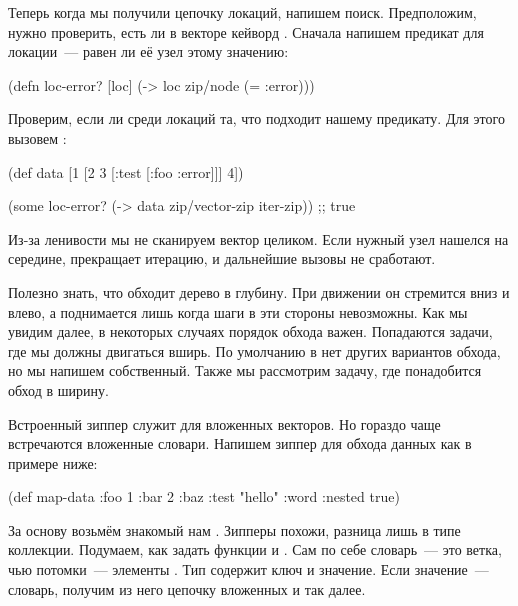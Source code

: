 Теперь когда мы получили цепочку локаций, напишем поиск. Предположим, нужно
проверить, есть ли в векторе кейворд . Сначала напишем предикат для
локации~--- равен ли её узел этому значению:

\begin{english}
  \begin{clojure}
(defn loc-error? [loc]
  (-> loc zip/node (= :error)))
  \end{clojure}
\end{english}

Проверим, если ли среди локаций та, что подходит нашему предикату.  Для этого
вызовем :

\begin{english}
  \begin{clojure}
(def data
  [1 [2 3 [:test [:foo :error]]] 4])

(some loc-error? (-> data
                     zip/vector-zip
                     iter-zip))
;; true
  \end{clojure}
\end{english}

Из-за ленивости мы не сканируем вектор целиком. Если нужный узел нашелся на
середине,  прекращает итерацию, и дальнейшие вызовы  не
сработают.

Полезно знать, что  обходит дерево в глубину. При движении он
стремится вниз и влево, а поднимается лишь когда шаги в эти стороны
невозможны. Как мы увидим далее, в некоторых случаях порядок обхода
важен. Попадаются задачи, где мы должны двигаться вширь. По умолчанию в
 нет других вариантов обхода, но мы напишем собственный. Также мы
рассмотрим задачу, где понадобится обход в ширину.


Встроенный зиппер  служит для вложенных векторов. Но гораздо
чаще встречаются вложенные словари. Напишем зиппер для обхода данных как в
примере ниже:

\begin{english}
  \begin{clojure}
(def map-data
  {:foo 1
   :bar 2
   :baz {:test "hello"
         :word {:nested true}}})
  \end{clojure}
\end{english}

За основу возьмём знакомый нам . Зипперы похожи, разница лишь в
типе коллекции. Подумаем, как задать функции  и
. Сам по себе словарь~--- это ветка, чью потомки~--- элементы
. Тип  содержит ключ и значение. Если значение~---
словарь, получим из него цепочку вложенных  и так далее.

